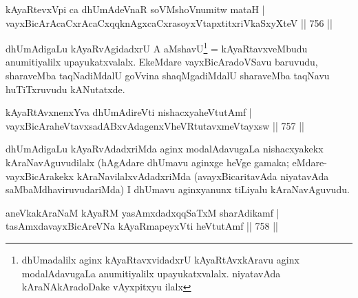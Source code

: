 
\begin{shl}
kAyaRtevxV\s pi ca dhUmAdeVnaR soVM\s shoV\s numitw mataH | \\
vayxBicArA\footnotemark[4]caCxrAcaCxqqknAgxcaCxrasoyxVtapxtitxriVkaSxyXteV \hfill||  756 ||  
\end{shl}

\begin{artha}
dhUmAdigaLu kAyaRvAgidadxrU A aMshavU\footnote{dhUmadalilx aginx kAyaRtavxvidadxrU kAyaRtAvxkAravu aginx modalAdavugaLa anumitiyalilx upayukatxvalalx. niyatavAda kAraNAkAradoDake vAyxpitxyu ilalx} = kAyaRtavxveMbudu anumitiyalilx upayukatxvalalx. EkeMdare vayxBicAradoVSavu baruvudu, sharaveMba taqNadiMdalU goVvina shaqMgadiMdalU sharaveMba taqNavu huTiTxruvudu kANutatxde.
\end{artha}


\begin{shl}
kAyaRtAvxnenxYva dhUmAdireVti nishacxyaheVtutAmf | \\
vayxBicAraheVtavxsadABxvAdagenxVheVRtutavxmeVtayxsw \hfill||  757 ||  
\end{shl}

\begin{artha}
dhUmAdigaLu kAyaRvAdadxriMda aginx modalAdavugaLa nishacxyakekx kAraNavAguvudilalx (hAgAdare dhUmavu aginxge heVge gamaka; eMdare- vayxBicArakekx kAraNavilalxvAdadxriMda (avayxBicaritavAda niyatavAda saMbaMdhaviruvudariMda) I dhUmavu aginxyanunx tiLiyalu kAraNavAguvudu.
\end{artha}


\begin{shl}
aneVkakAraNaM kAyaRM yasAmxdadxqqSaTxM sharAdikamf | \\
tasAmxdavayxBicAreVNa kAyaRmapeyxVti heVtutAmf \hfill||  758 ||  
\end{shl}

